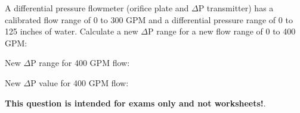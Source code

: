 

A differential pressure flowmeter (orifice plate and $\Delta$P transmitter) has a calibrated flow range of 0 to 300 GPM and a differential pressure range of 0 to 125 inches of water.  Calculate a new $\Delta$P range for a new flow range of 0 to 400 GPM:

\vskip 10pt

New $\Delta$P range for 400 GPM flow: \underbar{\hskip 50pt}







New $\Delta$P value for 400 GPM flow: 







{\bf This question is intended for exams only and not worksheets!}.



